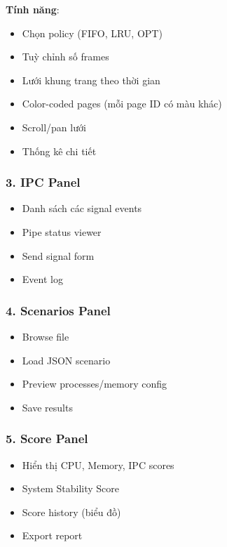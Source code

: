 \textbf{Tính năng}:
\begin{itemize}[leftmargin=1.5cm]
  \item Chọn policy (FIFO, LRU, OPT)
  \item Tuỳ chỉnh số frames
  \item Lưới khung trang theo thời gian
  \item Color-coded pages (mỗi page ID có màu khác)
  \item Scroll/pan lưới
  \item Thống kê chi tiết
\end{itemize}

\subsubsection{3. IPC Panel}

\begin{itemize}[leftmargin=1.5cm]
  \item Danh sách các signal events
  \item Pipe status viewer
  \item Send signal form
  \item Event log
\end{itemize}

\subsubsection{4. Scenarios Panel}

\begin{itemize}[leftmargin=1.5cm]
  \item Browse file
  \item Load JSON scenario
  \item Preview processes/memory config
  \item Save results
\end{itemize}

\subsubsection{5. Score Panel}

\begin{itemize}[leftmargin=1.5cm]
  \item Hiển thị CPU, Memory, IPC scores
  \item System Stability Score
  \item Score history (biểu đồ)
  \item Export report
\end{itemize}

